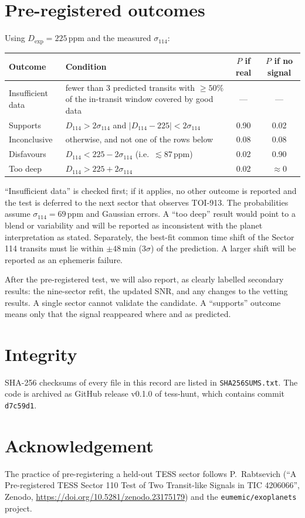 \documentclass[11pt]{article}
\begin{document}
\section*{Pre-registered outcomes}
Using $D_\mathrm{exp} = 225$\,ppm and the measured $\sigma_{114}$:
\begin{center}\footnotesize
\begin{tabular}{lp{2.6in}cc}
\toprule
Outcome & Condition & $P$ if real & $P$ if no signal \\
\midrule
Insufficient data & fewer than 3 predicted transits with $\geq 50\%$ of the in-transit window covered by good data & --- & --- \\
Supports & $D_{114} > 2\sigma_{114}$ and $|D_{114} - 225| < 2\sigma_{114}$ & 0.90 & 0.02 \\
Inconclusive & otherwise, and not one of the rows below & 0.08 & 0.08 \\
Disfavours & $D_{114} < 225 - 2\sigma_{114}$ (i.e.\ $\lesssim 87$\,ppm) & 0.02 & 0.90 \\
Too deep & $D_{114} > 225 + 2\sigma_{114}$ & 0.02 & $\approx 0$ \\
\bottomrule
\end{tabular}
\end{center}
``Insufficient data'' is checked first; if it applies, no other outcome is reported and the test is deferred to the next sector that observes TOI-913. The probabilities assume $\sigma_{114} = 69$\,ppm and Gaussian errors. A ``too deep'' result would point to a blend or variability and will be reported as inconsistent with the planet interpretation as stated. Separately, the best-fit common time shift of the Sector 114 transits must lie within $\pm 48$\,min ($3\sigma$) of the prediction. A larger shift will be reported as an ephemeris failure.

After the pre-registered test, we will also report, as clearly labelled secondary results: the nine-sector refit, the updated SNR, and any changes to the vetting results. A single sector cannot validate the candidate. A ``supports'' outcome means only that the signal reappeared where and as predicted.

\section*{Integrity}
SHA-256 checksums of every file in this record are listed in \texttt{SHA256SUMS.txt}. The code is archived as GitHub release v0.1.0 of tess-hunt, which contains commit \texttt{d7c59d1}.

\section*{Acknowledgement}
The practice of pre-registering a held-out TESS sector follows P.~Rabtsevich (``A Pre-registered TESS Sector 110 Test of Two Transit-like Signals in TIC 4206066'', Zenodo, \url{https://doi.org/10.5281/zenodo.23175179}) and the \texttt{eumemic/exoplanets} project.
\end{document}

